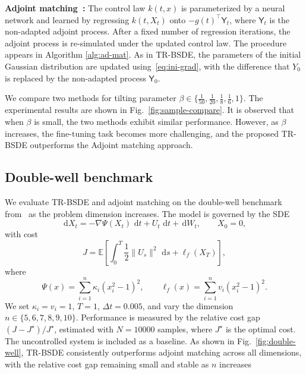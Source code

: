 \documentclass[letterpaper, 10 pt, conference]{ieeeconf}  %
\newcommand{\ud}{\,\mathrm{d}}
\newcommand{\Yn}{\mathsf Y}
\begin{document}
\medskip
\noindent 
{\bf Adjoint matching~\cite{domingoadjoint}:} The control law $k(t,x)$ is parameterized by a neural network and learned by regressing $k(t,X_t)$ onto $-g(t)^\top \Yn_t$, where $\Yn_t$ is the non-adapted adjoint process. After a fixed number of regression iterations, the adjoint process is re-simulated under the updated control law. The procedure appears in Algorithm \ref{alg:ad-mat}. As in TR-BSDE, the parameters of the initial Gaussian distribution are updated using~\eqref{eq:ini-grad}, with the difference that $Y_0$ is replaced by the non-adapted process $\Yn_0$.  

We compare two methods for tilting parameter $\beta \in \{\frac{1}{50}, \frac{1}{20}, \frac{1}{8}, \frac{1}{6}, 1\}$.
The experimental results are shown in Fig.~\ref{fig:sample-compare}. It is observed that when $\beta$ is small, the two methods exhibit similar performance. However, as $\beta$ increases, the fine-tuning task becomes more challenging, and the proposed TR-BSDE outperforms the Adjoint matching approach.

\subsection{Double-well benchmark}

We evaluate TR-BSDE and adjoint matching on the double-well benchmark 
from~\cite{nusken2021solving} as the problem dimension increases. The model 
is governed by the SDE
\begin{equation}
    \ud X_t = -\nabla\Psi(X_t)\,\ud t + U_t\,\ud t + \ud W_t, \qquad X_0 = 0,
\end{equation}
with cost
\begin{equation}
    J = \mathbb{E}\!\left[\int_0^T\frac{1}{2}\|U_s\|^2\,\ud s 
    + \ell_f(X_T)\right],
\end{equation}
where
\[
    \Psi(x) = \sum_{i=1}^n \kappa_i(x_i^2-1)^2, \qquad 
    \ell_f(x) = \sum_{i=1}^n v_i(x_i^2-1)^2.
\]
We set $\kappa_i = v_i = 1$, $T=1$, $\Delta t = 0.005$, and vary the 
dimension $n \in \{5,6,7,8,9,10\}$. Performance is measured by the relative 
cost gap $(J-J^\star)/J^\star$, estimated with $N=10000$ samples, where 
$J^\star$ is the optimal cost. The uncontrolled system is included as a 
baseline. As shown in Fig.~\ref{fig:double-well}, TR-BSDE consistently 
outperforms adjoint matching across all dimensions, with the relative cost 
gap remaining small and stable as $n$ increases
\end{document}
